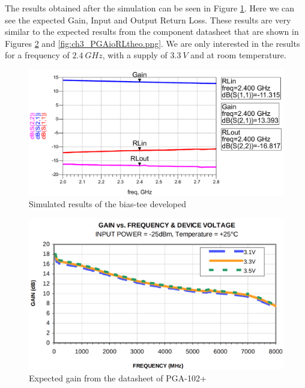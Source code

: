 \par The results obtained after the simulation can be seen in Figure \ref{fig:ch3_PGASim.png}. Here we can see the expected Gain, Input and Output Return Loss. These results are very similar to the expected results from the component datasheet that are shown in Figures \ref{fig:ch3_PGAGainTheo.png} and \ref{fig:ch3_PGAioRLtheo.png}. We are only interested in the results for a frequency of $2.4 \:\si{GHz}$, with a supply of $3.3 \:\si{V}$ and at room temperature.

\begin{figure}[H]
    \vspace*{0cm}
    \centering
    \includegraphics[width=0.9\linewidth]{figs/ch3_PGASim.png}
    \caption{Simulated results of the bias-tee developed}
    \label{fig:ch3_PGASim.png}
\end{figure}

\begin{figure}[H]
    \vspace*{0cm}
    \centering
    \includegraphics[width=0.9\linewidth]{figs/ch3_PGAGainTheo.png}
    \caption{Expected gain from the datasheet of PGA-102+ \cite{MonolithicPGA-102+}}
    \label{fig:ch3_PGAGainTheo.png}
\end{figure}

